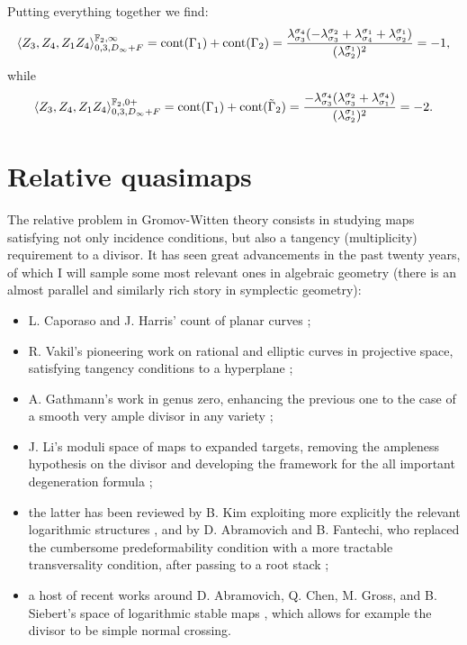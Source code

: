 Putting everything together we find:
\[ \langle Z_3,Z_4,Z_1Z_4\rangle^{\mathbb F_2,\infty}_{0,3,D_\infty+F}=\rm{cont}(\Gamma_1)+\rm{cont}(\Gamma_2)=\frac{\lambda^{\sigma_{4}}_{\sigma_{3}}(-\lambda^{\sigma_{2}}_{\sigma_{3}}+\lambda^{\sigma_{1}}_{\sigma_{4}}+\lambda^{\sigma_{1}}_{\sigma_{2}})}{(\lambda^{\sigma_{1}}_{\sigma_{2}})^2}=-1,\]
while
\[\langle Z_3,Z_4,Z_1Z_4\rangle^{\mathbb F_2,0+}_{0,3,D_\infty+F}=\rm{cont}(\Gamma_1)+\rm{cont}(\tilde\Gamma_2)=\frac{-\lambda^{\sigma_{4}}_{\sigma_{3}}(\lambda^{\sigma_{2}}_{\sigma_{3}}+\lambda^{\sigma_{4}}_{\sigma_{1}})}{(\lambda^{\sigma_{1}}_{\sigma_{2}})^2}=-2.\]



\section{Relative quasimaps}\label{sec:rel_qm}
The relative problem in Gromov-Witten theory consists in studying maps satisfying not only incidence conditions, but also a tangency (multiplicity) requirement to a divisor. It has seen great advancements in the past twenty years, of which I will sample some most relevant ones in algebraic geometry (there is an almost parallel and similarly rich story in symplectic geometry):
\begin{itemize}
 \item L. Caporaso and J. Harris' count of planar curves \cite{CH};
 \item R. Vakil's pioneering work on rational and elliptic curves in projective space, satisfying tangency conditions to a hyperplane \cite{Vre};
 \item A. Gathmann's work in genus zero, enhancing the previous one to the case of a smooth very ample divisor in any variety \cite{Ga};
 \item J. Li's moduli space of maps to expanded targets, removing the ampleness hypothesis on the divisor and developing the framework for the all important degeneration formula \cites{Li1,Li2};
 \item the latter has been reviewed by B. Kim exploiting more explicitly the relevant logarithmic structures \cite{KimLog}, and by D. Abramovich and B. Fantechi, who replaced the cumbersome predeformability condition with a more tractable transversality condition, after passing to a root stack \cite{AbramovichFantechi};
 \item a host of recent works around D. Abramovich, Q. Chen, M. Gross, and B. Siebert's space of logarithmic stable maps \cite{ChenLog,AbramovichChenLog,GrossSiebertLog}, which allows for example the divisor to be simple normal crossing.
\end{itemize}
